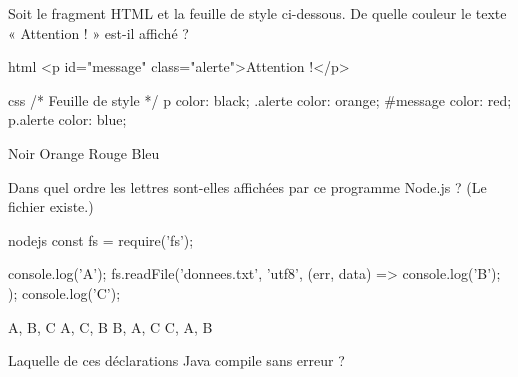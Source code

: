 \begin{mcq}
  Soit le fragment HTML et la feuille de style ci-dessous. De quelle
  couleur le texte « Attention ! » est-il affiché ?
\begin{code}{html}
<p id="message" class="alerte">Attention !</p>
\end{code}
\begin{code}{css}
/* Feuille de style */
p        { color: black; }
.alerte  { color: orange; }
#message { color: red; }
p.alerte { color: blue; }
\end{code}
  \begin{choices}[columns=4]
    \wrong   Noir
    \wrong   Orange
    \correct Rouge
    \wrong   Bleu
  \end{choices}
\end{mcq}

\begin{mcq}
  Dans quel ordre les lettres sont-elles affichées par ce programme
  Node.js ? (Le fichier  existe.)
\begin{code}{nodejs}
const fs = require('fs');

console.log('A');
fs.readFile('donnees.txt', 'utf8', (err, data) => {
  console.log('B');
});
console.log('C');
\end{code}
  \begin{choices}[columns=4]
    \wrong   A, B, C
    \correct A, C, B
    \wrong   B, A, C
    \wrong   C, A, B
  \end{choices}
\end{mcq}

\begin{mcq}
  Laquelle de ces déclarations Java compile sans erreur ?
  \begin{choices}
    \wrong   {}
    \wrong   {}
    \correct {}
    \wrong   {}
  \end{choices}
\end{mcq}
